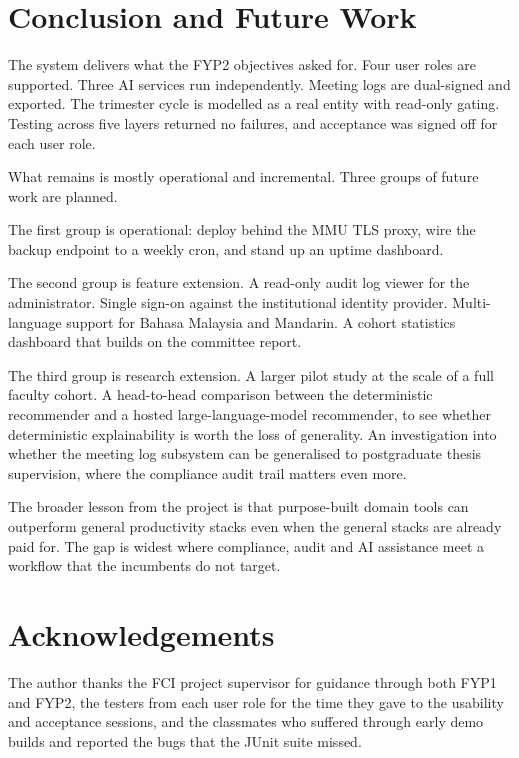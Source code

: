 \documentclass[conference,a4paper]{IEEEtran}
\begin{document}
\section{Conclusion and Future Work}
The system delivers what the FYP2 objectives asked for. Four user roles are supported. Three AI services run independently. Meeting logs are dual-signed and exported. The trimester cycle is modelled as a real entity with read-only gating. Testing across five layers returned no failures, and acceptance was signed off for each user role.

What remains is mostly operational and incremental. Three groups of future work are planned.

The first group is operational: deploy behind the MMU TLS proxy, wire the backup endpoint to a weekly cron, and stand up an uptime dashboard.

The second group is feature extension. A read-only audit log viewer for the administrator. Single sign-on against the institutional identity provider. Multi-language support for Bahasa Malaysia and Mandarin. A cohort statistics dashboard that builds on the committee report.

The third group is research extension. A larger pilot study at the scale of a full faculty cohort. A head-to-head comparison between the deterministic recommender and a hosted large-language-model recommender, to see whether deterministic explainability is worth the loss of generality. An investigation into whether the meeting log subsystem can be generalised to postgraduate thesis supervision, where the compliance audit trail matters even more.

The broader lesson from the project is that purpose-built domain tools can outperform general productivity stacks even when the general stacks are already paid for. The gap is widest where compliance, audit and AI assistance meet a workflow that the incumbents do not target.

\section*{Acknowledgements}
The author thanks the FCI project supervisor for guidance through both FYP1 and FYP2, the testers from each user role for the time they gave to the usability and acceptance sessions, and the classmates who suffered through early demo builds and reported the bugs that the JUnit suite missed.
\end{document}
